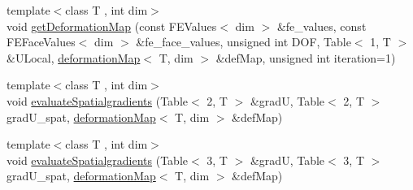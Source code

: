 \begin{DoxyCompactItemize}
\item 
{\footnotesize template$<$class T , int dim$>$ }\\void \mbox{\hyperlink{group___evaluation_functions_ga239b206235603af9482484c29c8d57ea}{get\+Deformation\+Map}} (const F\+E\+Values$<$ dim $>$ \&fe\+\_\+values, const F\+E\+Face\+Values$<$ dim $>$ \&fe\+\_\+face\+\_\+values, unsigned int D\+OF, Table$<$ 1, T $>$ \&U\+Local, \mbox{\hyperlink{structdeformation_map}{deformation\+Map}}$<$ T, dim $>$ \&def\+Map, unsigned int iteration=1)
\item 
{\footnotesize template$<$class T , int dim$>$ }\\void \mbox{\hyperlink{group___evaluation_functions_gadb862d9530a60b8ce5255222778ceeb6}{evaluate\+Spatialgradients}} (Table$<$ 2, T $>$ \&gradU, Table$<$ 2, T $>$ grad\+U\+\_\+spat, \mbox{\hyperlink{structdeformation_map}{deformation\+Map}}$<$ T, dim $>$ \&def\+Map)
\item 
{\footnotesize template$<$class T , int dim$>$ }\\void \mbox{\hyperlink{group___evaluation_functions_ga0b976342d491f6215953e2e65ea6a0de}{evaluate\+Spatialgradients}} (Table$<$ 3, T $>$ \&gradU, Table$<$ 3, T $>$ grad\+U\+\_\+spat, \mbox{\hyperlink{structdeformation_map}{deformation\+Map}}$<$ T, dim $>$ \&def\+Map)
\end{DoxyCompactItemize}
